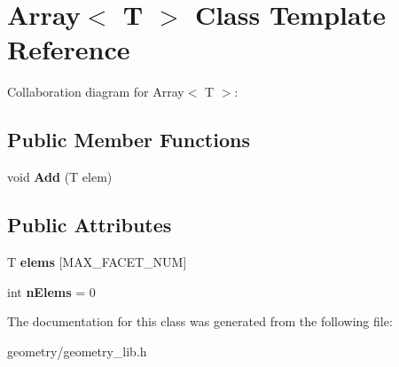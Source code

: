 \hypertarget{class_array}{}\section{Array$<$ T $>$ Class Template Reference}
\label{class_array}


Collaboration diagram for Array$<$ T $>$\+:
\subsection*{Public Member Functions}
\begin{DoxyCompactItemize}
\item 
\mbox{\label{class_array_ababd1630185238fc7ae53eb5511c387c}} 
void {\bfseries Add} (T elem)
\end{DoxyCompactItemize}
\subsection*{Public Attributes}
\begin{DoxyCompactItemize}
\item 
\mbox{\label{class_array_a1320e9390ef809dc599b9d9f15889243}} 
T {\bfseries elems} \mbox{[}M\+A\+X\+\_\+\+F\+A\+C\+E\+T\+\_\+\+N\+UM\mbox{]}
\item 
\mbox{\label{class_array_a126a35ed55d30c6ab4955c99d8b2d4ed}} 
int {\bfseries n\+Elems} = 0
\end{DoxyCompactItemize}


The documentation for this class was generated from the following file\+:\begin{DoxyCompactItemize}
\item 
geometry/geometry\+\_\+lib.\+h\end{DoxyCompactItemize}
